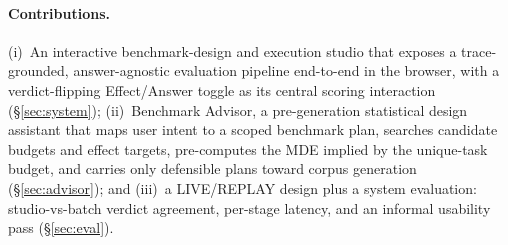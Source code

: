 \paragraph{Contributions.} (i)~An interactive benchmark-design and execution
studio that exposes a trace-grounded, answer-agnostic evaluation pipeline
end-to-end in the browser, with a verdict-flipping Effect/Answer toggle as its
central scoring interaction (\S\ref{sec:system}); (ii)~Benchmark Advisor, a
pre-generation statistical design assistant that maps user intent to a scoped
benchmark plan, searches candidate budgets and effect targets, pre-computes the
MDE implied by the unique-task budget, and carries only defensible plans toward
corpus generation (\S\ref{sec:advisor}); and (iii)~a LIVE/REPLAY design plus a
system evaluation:
studio-vs-batch verdict agreement, per-stage latency, and an informal usability
pass (\S\ref{sec:eval}).
